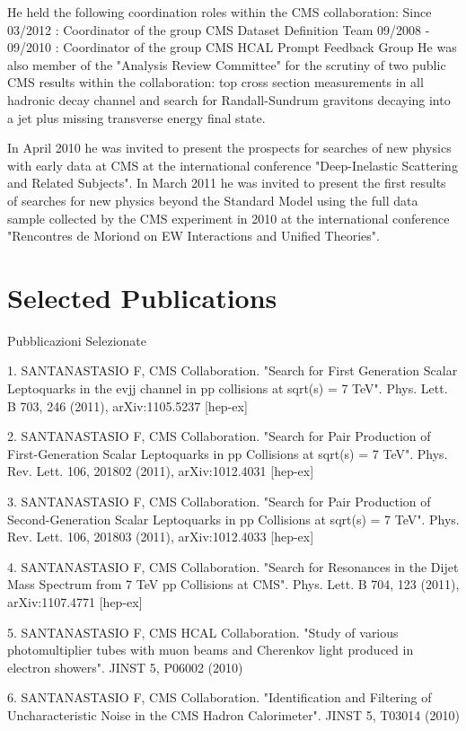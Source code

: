 \documentclass[10pt, a4paper]{article}
\begin{document}
He held the following coordination roles within the CMS collaboration: 
Since 03/2012 : Coordinator of the group CMS Dataset Definition Team 
09/2008 - 09/2010 : Coordinator of the group CMS HCAL Prompt Feedback Group     
He was also member of the "Analysis Review Committee" for the scrutiny of two public CMS results within the collaboration: top cross section measurements in all hadronic decay channel and search for Randall-Sundrum gravitons decaying into a jet plus missing transverse energy final state.

In April 2010 he was invited to present the prospects for searches of new physics with early data at CMS at the international conference "Deep-Inelastic Scattering and Related Subjects". 
In March 2011 he was invited to present the first results of searches for new physics beyond the Standard Model using the full data sample collected by the CMS experiment in 2010 at the international conference "Rencontres de Moriond on EW Interactions and Unified Theories".


\section*{Selected Publications}

Pubblicazioni Selezionate

1. SANTANASTASIO F, CMS Collaboration. "Search for First Generation Scalar Leptoquarks in the evjj channel in pp collisions at sqrt(s) = 7 TeV". Phys. Lett. B 703, 246 (2011), arXiv:1105.5237 [hep-ex]

2. SANTANASTASIO F, CMS Collaboration. "Search for Pair Production of First-Generation Scalar Leptoquarks in pp Collisions at sqrt(s) = 7 TeV". Phys. Rev. Lett. 106, 201802 (2011), arXiv:1012.4031 [hep-ex]

3. SANTANASTASIO F, CMS Collaboration. "Search for Pair Production of Second-Generation Scalar Leptoquarks in pp Collisions at sqrt(s) = 7 TeV". Phys. Rev. Lett.  106, 201803 (2011), arXiv:1012.4033 [hep-ex]

4. SANTANASTASIO F, CMS Collaboration. "Search for Resonances in the Dijet Mass Spectrum from 7 TeV pp Collisions at CMS". Phys. Lett. B 704, 123 (2011), arXiv:1107.4771 [hep-ex]

5. SANTANASTASIO F, CMS HCAL Collaboration. "Study of various photomultiplier tubes with muon beams and Cherenkov light produced in electron showers". JINST 5, P06002 (2010)

6. SANTANASTASIO F, CMS Collaboration. "Identification and Filtering of Uncharacteristic Noise in the CMS Hadron Calorimeter". JINST 5, T03014 (2010)
\end{document}
